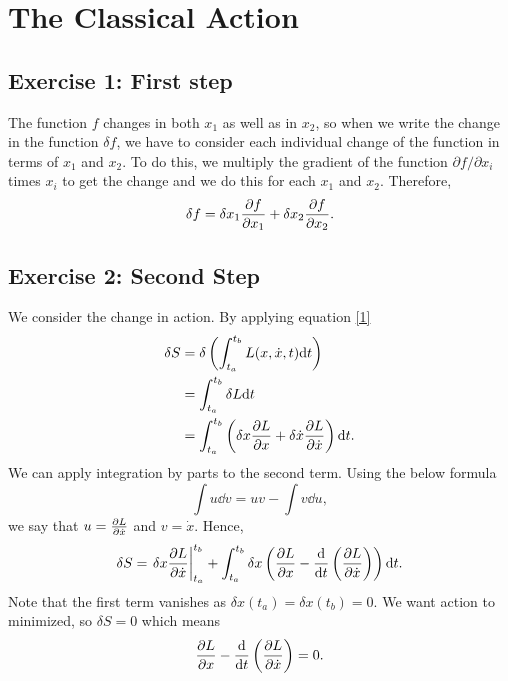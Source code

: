 \section{The Classical Action}
\subsection{Exercise 1: First step}
The function $f$ changes in both $x_1$ as well as in $x_2$, so when we write the change in the function $\delta f$, we have to consider each individual change of the function in terms of $x_1$ and $x_2$. To do this, we multiply the gradient of the function $\partial f/\partial x_i$ times $x_i$ to get the change and we do this for each $x_1$ and $x_2$. Therefore, 
\begin{equation}\label{1}
\delta f = \delta x_1 \pdv{f}{x_1} + \delta x_2\pdv{f}{x_2}.
\end{equation}
\subsection{Exercise 2: Second Step}
We consider the change in action. By applying equation \eqref{1}
\begin{align}
\delta S &= \delta\left(\int_{t_a}^{t_b}L(x, \dot x, t) \dd t\right) \\
&= \int_{t_a}^{t_b}\delta L \dd t \\
&= \int_{t_a}^{t_b}\left(\delta x \pdv{L}{x} + \delta \dot{x}\pdv{L}{\dot x}\right)\dd t.
\end{align}
We can apply integration by parts to the second term. Using the below formula
\begin{equation}
    \int u\dd v = uv - \int v \dd u,
\end{equation}
we say that $u = \pdv{L}{\dot x}$ and $v = \dot x$. Hence, 
\begin{equation}
    \delta S = \left.\delta x\pdv{L}{\dot x}\right|_{t_a}^{t_b} + \int_{t_a}^{t_b}\delta x\left(\pdv{L}{x} - \dv{}{t}\left(\pdv{L}{\dot x}\right)\right)\dd t.
\end{equation}
Note that the first term vanishes as $\delta x(t_a) = \delta x (t_b) = 0$. We want action to minimized, so $\delta S = 0$ which means 
\begin{equation}\label{EL}
    \pdv{L}{x} - \dv{}{t}\left(\pdv{L}{\dot x}\right) = 0.
\end{equation}
